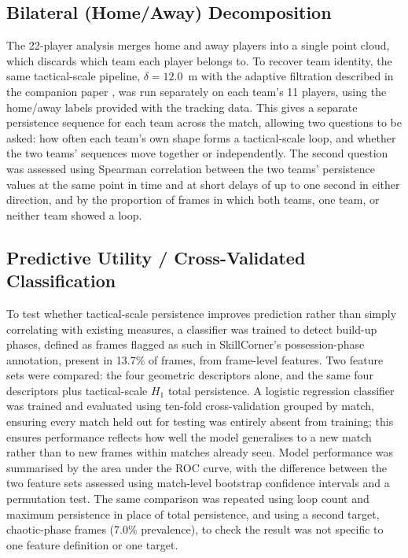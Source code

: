 \subsection{Bilateral (Home/Away) Decomposition}

The 22-player analysis merges home and away players into a single point
cloud, which discards which team each player belongs to. To recover
team identity, the same tactical-scale pipeline, $\delta=12.0$~m with the adaptive filtration described in the companion paper \cite{paperA}, was run separately on each team's 11 players, using
the home/away labels provided with the tracking data. This gives a
separate persistence sequence for each team across the match, allowing
two questions to be asked: how often each team's own shape forms a
tactical-scale loop, and whether the two teams' sequences move together
or independently. The second question was assessed using Spearman
correlation between the two teams' persistence values at the same point
in time and at short delays of up to one second in either direction,
and by the proportion of frames in which both teams, one team, or
neither team showed a loop.

\subsection{Predictive Utility / Cross-Validated Classification}

To test whether tactical-scale persistence improves prediction rather
than simply correlating with existing measures, a classifier was
trained to detect build-up phases, defined as frames flagged as such in SkillCorner's possession-phase annotation, present in 13.7\% of frames, from frame-level features. Two feature sets were compared: the four
geometric descriptors alone, and the same four descriptors plus
tactical-scale $H_1$ total persistence. A logistic regression classifier
was trained and evaluated using ten-fold cross-validation grouped by
match, ensuring every match held out for testing was entirely absent
from training; this ensures performance reflects how well the model
generalises to a new match rather than to new frames within matches
already seen. Model performance was summarised by the area under the
ROC curve, with the difference between the two feature sets assessed
using match-level bootstrap confidence intervals and a permutation
test. The same comparison was repeated using loop count and maximum
persistence in place of total persistence, and using a second target,
chaotic-phase frames (7.0\% prevalence), to check the result was not
specific to one feature definition or one target.
